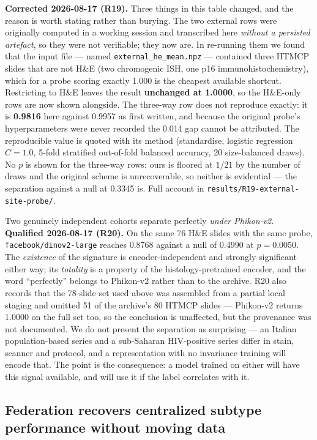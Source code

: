 \documentclass[11pt,a4paper]{article}
\begin{document}
\textcolor{qred}{\textbf{Corrected 2026-08-17 (R19).}} Three things in this table changed, and the
reason is worth stating rather than burying. The two external rows were originally computed in a
working session and transcribed here \emph{without a persisted artefact}, so they were not
verifiable; they now are. In re-running them we found that the input file --- named
\texttt{external\_he\_mean.npz} --- contained three HTMCP slides that are not H\&E (two chromogenic
ISH, one p16 immunohistochemistry), which for a probe scoring exactly 1.000 is the cheapest
available shortcut. Restricting to H\&E leaves the result \textbf{unchanged at 1.0000}, so the
H\&E-only rows are now shown alongside. The three-way row does not reproduce exactly: it is
\textbf{0.9816} here against 0.9957 as first written, and because the original probe's
hyperparameters were never recorded the 0.014 gap cannot be attributed. The reproducible value is
quoted with its method (standardise, logistic regression $C=1.0$, 5-fold stratified out-of-fold
balanced accuracy, 20 size-balanced draws). No $p$ is shown for the three-way rows: ours is floored
at $1/21$ by the number of draws and the original scheme is unrecoverable, so neither is
evidential --- the separation against a null at 0.3345 is. Full account in
\texttt{results/R19-external-site-probe/}.

Two genuinely independent cohorts separate perfectly \emph{under Phikon-v2}.
\textcolor{qred}{\textbf{Qualified 2026-08-17 (R20).}} On the same 76 H\&E slides with the same
probe, \texttt{facebook/dinov2-large} reaches 0.8768 against a null of 0.4990 at $p = 0.0050$. The
\emph{existence} of the signature is encoder-independent and strongly significant either way; its
\emph{totality} is a property of the histology-pretrained encoder, and the word ``perfectly''
belongs to Phikon-v2 rather than to the archive. R20 also records that the 78-slide set used above
was assembled from a partial local staging and omitted 51 of the archive's 80 HTMCP slides ---
Phikon-v2 returns 1.0000 on the full set too, so the conclusion is unaffected, but the provenance
was not documented. We do not present the separation as surprising ---
an Italian population-based series and a sub-Saharan HIV-positive series differ in stain,
scanner and protocol, and a representation with no invariance training will encode that. The
point is the consequence: a model trained on either will have this signal available, and will
use it if the label correlates with it.

\subsection{Federation recovers centralized subtype performance without moving data}
\end{document}
